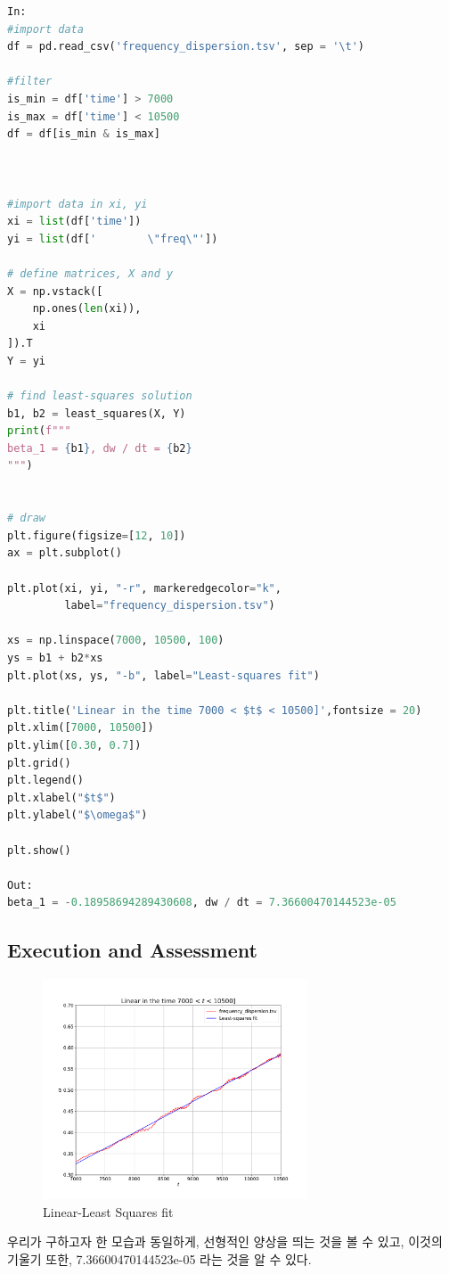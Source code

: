 \documentclass[11pt]{article}
\begin{document}
\begin{lstlisting}[language=Python]
In:
#import data
df = pd.read_csv('frequency_dispersion.tsv', sep = '\t')

#filter
is_min = df['time'] > 7000 
is_max = df['time'] < 10500
df = df[is_min & is_max]



#import data in xi, yi
xi = list(df['time'])
yi = list(df['        \"freq\"']) 

# define matrices, X and y
X = np.vstack([
    np.ones(len(xi)),
    xi
]).T
Y = yi

# find least-squares solution
b1, b2 = least_squares(X, Y)
print(f"""
beta_1 = {b1}, dw / dt = {b2}
""")


# draw
plt.figure(figsize=[12, 10])
ax = plt.subplot()

plt.plot(xi, yi, "-r", markeredgecolor="k",
         label="frequency_dispersion.tsv")

xs = np.linspace(7000, 10500, 100)
ys = b1 + b2*xs
plt.plot(xs, ys, "-b", label="Least-squares fit")

plt.title('Linear in the time 7000 < $t$ < 10500]',fontsize = 20)
plt.xlim([7000, 10500])
plt.ylim([0.30, 0.7])
plt.grid()
plt.legend()
plt.xlabel("$t$")
plt.ylabel("$\omega$")

plt.show()

Out:
beta_1 = -0.18958694289430608, dw / dt = 7.36600470144523e-05
\end{lstlisting}
\subsection{Execution and Assessment}
\begin{figure}[!ht]
  \centering
  \includegraphics[width=0.7\textwidth]{Linear_in_the_time.pdf}
  \caption{Linear-Least Squares fit}
\end{figure}
우리가 구하고자 한 모습과 동일하게, 선형적인 양상을 띄는 것을 볼 수 있고, 이것의 기울기 또한, 7.36600470144523e-05 라는 것을 알 수 있다.
\pagebreak
\end{document}
